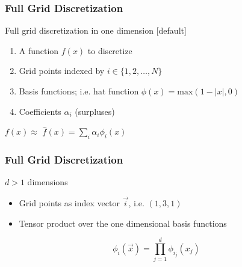 \begin{frame}
  \frametitle{Full Grid Discretization}
  \topline
  \vspace{-10px}
  \begin{block}{Full grid discretization in one dimension}
    [default]
    \begin{enumerate}
    \item A function $f(x)$ to discretize
    \item Grid points indexed by $i \in \{1,2,\dots ,N\}$
    \item Basis functions; i.e. hat function $\phi(x)=\text{max}(1 - |x|, 0)$
    \item Coefficients $\alpha_i$ (surpluses)
    \end{enumerate}
    \vspace{10px}
    \begin{center}
      $f(x) \approx$ $\hat{f}(x) = \sum_{i}^{}{\alpha_i \phi_i(x)}$
    \end{center}
  \end{block}
\end{frame}

\begin{frame}
  \frametitle{Full Grid Discretization}
  \topline
  \vspace{-10px}
  \begin{block}{$d > 1$ dimensions}
    \begin{itemize}
      \item Grid points as index vector $\vec{i}$, i.e. $(1,3,1)$
      \item Tensor product over the one dimensional basis functions
    \end{itemize}
    \begin{center}
      $$ \phi_i(\vec{x}) = \prod_{j=1}^d{\phi_{i_j}(x_j)}$$
    \end{center}
  \end{block}
\end{frame}



